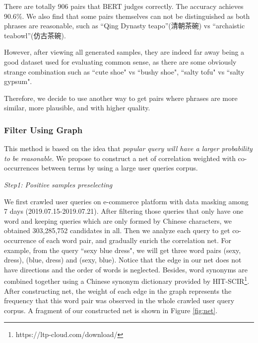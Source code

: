There are totally 906 pairs that BERT judges correctly. The accuracy achieves 90.6\%. We also find that some pairs themselves can not be distinguished as both phrases are reasonable, such as ``Qing Dynasty teapo''(清朝茶碗) vs ``archaistic teabowl''(仿古茶碗). %

However, after viewing all generated samples, %
they are indeed far away being a good dataset used for evaluating common sense, as there are some obviously strange combination such as ``cute shoe" vs ``bushy shoe", ``salty tofu" vs ``salty gypsum". 

Therefore, we decide to use another way to get pairs where phrases are more similar, more plausible, and with higher quality.

\subsubsection{Filter Using Graph}

This method is based on the idea that \textit{popular query will have a larger probability to be reasonable}. We propose to construct a net of correlation weighted with co-occurrences between terms by using a large user queries corpus.

\textit{Step1: Positive samples preselecting}

We first crawled user queries on e-commerce platform with data masking among 7 days (2019.07.15-2019.07.21). After filtering those queries that only have one word and keeping queries which are only formed by Chinese characters, we obtained 303,285,752 candidates in all. Then we analyze each query to get co-occurrence of each word pair, and gradually enrich the correlation net. 
For example, from the query ``sexy blue dress", we will get three word pairs (sexy, dress), (blue, dress) and (sexy, blue). Notice that the edge in our net does not have directions and the order of words is neglected.
Besides, word synonyms are combined together using a Chinese synonym dictionary provided by HIT-SCIR\footnote{https://ltp-cloud.com/download/}.
After constructing net, the weight of each edge in the graph represents the frequency %
that this word pair was observed in the whole crawled user query corpus. A fragment of our constructed net is shown in Figure \ref{fig:net}.

